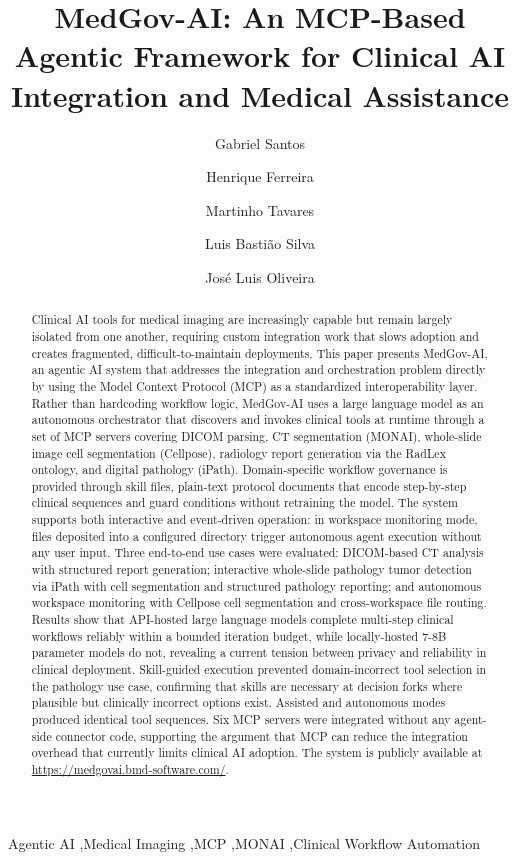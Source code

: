 \documentclass[preprint,12pt]{elsarticle}
\begin{document}
\begin{frontmatter}

\title{MedGov-AI: An MCP-Based Agentic Framework for Clinical AI Integration and Medical Assistance}

\author[1]{Gabriel Santos}
\author[1]{Henrique Ferreira}
\author[2]{Martinho Tavares}
\author[2]{Luis Basti\~ao Silva}
\author[1]{José Luis Oliveira}
\address[1]{University of Aveiro, Aveiro, Portugal}
\address[2]{BMD Software, Ílhavo, Portugal}

\begin{abstract}
Clinical AI tools for medical imaging are increasingly capable but remain largely isolated from one another, requiring custom integration work that slows adoption and creates fragmented, difficult-to-maintain deployments. This paper presents MedGov-AI, an agentic AI system that addresses the integration and orchestration problem directly by using the Model Context Protocol (MCP) as a standardized interoperability layer. Rather than hardcoding workflow logic, MedGov-AI uses a large language model as an autonomous orchestrator that discovers and invokes clinical tools at runtime through a set of MCP servers covering DICOM parsing, CT segmentation (MONAI), whole-slide image cell segmentation (Cellpose), radiology report generation via the RadLex ontology, and digital pathology (iPath). Domain-specific workflow governance is provided through skill files, plain-text protocol documents that encode step-by-step clinical sequences and guard conditions without retraining the model. The system supports both interactive and event-driven operation: in workspace monitoring mode, files deposited into a configured directory trigger autonomous agent execution without any user input. Three end-to-end use cases were evaluated: DICOM-based CT analysis with structured report generation; interactive whole-slide pathology tumor detection via iPath with cell segmentation and structured pathology reporting; and autonomous workspace monitoring with Cellpose cell segmentation and cross-workspace file routing. Results show that API-hosted large language models complete multi-step clinical workflows reliably within a bounded iteration budget, while locally-hosted 7-8B parameter models do not, revealing a current tension between privacy and reliability in clinical deployment. Skill-guided execution prevented domain-incorrect tool selection in the pathology use case, confirming that skills are necessary at decision forks where plausible but clinically incorrect options exist. Assisted and autonomous modes produced identical tool sequences. Six MCP servers were integrated without any agent-side connector code, supporting the argument that MCP can reduce the integration overhead that currently limits clinical AI adoption. The system is publicly available at \url{https://medgovai.bmd-software.com/}.
\end{abstract}

\begin{keyword}
Agentic AI \sep Medical Imaging \sep MCP \sep MONAI \sep Clinical Workflow Automation
\end{keyword}

\end{frontmatter}
\end{document}
